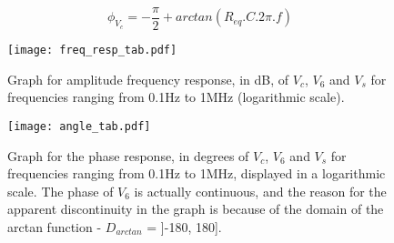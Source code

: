 \begin{equation}
  \phi_{V_c} = -\frac{\pi}{2} + arctan(R_{eq}.C.2\pi.f)
  \label{eq:freqresp2}
\end{equation}
\begin{figure}[H] \centering
\texttt{[image: freq\_resp\_tab.pdf]}
\vspace{10px}
\caption{Graph for amplitude frequency response, in dB, of $V_c$, $V_6$ and $V_s$ for frequencies ranging from 0.1Hz to 1MHz (logarithmic scale).}
\label{fig:freq_resp}
\end{figure}



\begin{figure}[H] \centering
\texttt{[image: angle\_tab.pdf]}
\vspace{10px}
\caption{Graph for the phase response, in degrees of $V_c$, $V_6$ and $V_s$ for frequencies ranging from 0.1Hz to 1MHz, displayed in a logarithmic scale. The phase of $V_6$ is actually continuous, and the reason for the apparent discontinuity in the graph is because of the domain of the arctan function - $D_{arctan}$ = ]-180, 180].}
\label{fig:angle_resp}
\end{figure}



